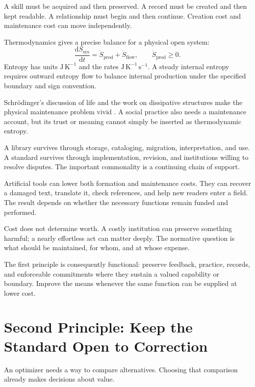 \documentclass[11pt,openany]{book}
\begin{document}
A skill must be acquired and then preserved. A record must be created and then kept readable. A relationship must begin and then continue. Creation cost and maintenance cost can move independently.

Thermodynamics gives a precise balance for a physical open system:
\begin{equation}
 \frac{\mathrm d S_{\mathrm{sys}}}{\mathrm dt}
 =\dot S_{\mathrm{prod}}+\dot S_{\mathrm{flow}},
 \qquad \dot S_{\mathrm{prod}}\geq0.
\end{equation}
Entropy has units $\mathrm{J\,K^{-1}}$ and the rates $\mathrm{J\,K^{-1}\,s^{-1}}$. A steady internal entropy requires outward entropy flow to balance internal production under the specified boundary and sign convention.

Schrödinger's discussion of life and the work on dissipative structures make the physical maintenance problem vivid \cite{schrodinger1944,nicolis1977,prigogine1977nobel}. A social practice also needs a maintenance account, but its trust or meaning cannot simply be inserted as thermodynamic entropy.

A library survives through storage, cataloging, migration, interpretation, and use. A standard survives through implementation, revision, and institutions willing to resolve disputes. The important commonality is a continuing chain of support.

Artificial tools can lower both formation and maintenance costs. They can recover a damaged text, translate it, check references, and help new readers enter a field. The result depends on whether the necessary functions remain funded and performed.

Cost does not determine worth. A costly institution can preserve something harmful; a nearly effortless act can matter deeply. The normative question is what should be maintained, for whom, and at whose expense.

The first principle is consequently functional: preserve feedback, practice, records, and enforceable commitments where they sustain a valued capability or boundary. Improve the means whenever the same function can be supplied at lower cost.

\section{Second Principle: Keep the Standard Open to Correction}

An optimizer needs a way to compare alternatives. Choosing that comparison already makes decisions about value.
\end{document}
